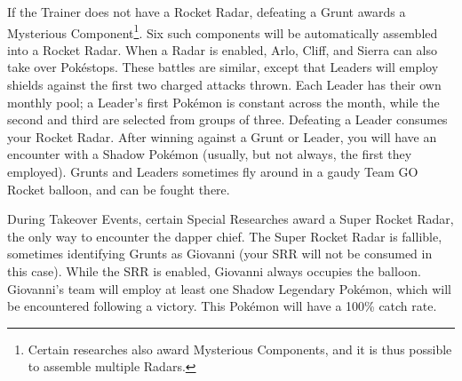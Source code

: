 If the Trainer does not have a Rocket Radar, defeating a Grunt awards a Mysterious Component\footnote{Certain researches also award Mysterious Components, and it is thus possible to assemble multiple Radars.}.
Six such components will be automatically assembled into a Rocket Radar.
When a Radar is enabled, Arlo, Cliff, and Sierra can also take over Pokéstops.
These battles are similar, except that Leaders will employ shields against the first two charged attacks thrown.
Each Leader has their own monthly pool; a Leader's first Pokémon is constant
 across the month, while the second and third are selected from groups of three.
Defeating a Leader consumes your Rocket Radar.
After winning against a Grunt or Leader, you will have an encounter with a Shadow Pokémon (usually,
 but not always, the first they employed).
Grunts and Leaders sometimes fly around in a gaudy Team GO Rocket balloon,
  and can be fought there.

During Takeover Events, certain Special Researches award a Super Rocket Radar,
 the only way to encounter the dapper chief.
The Super Rocket Radar is fallible, sometimes identifying Grunts as Giovanni
 (your SRR will not be consumed in this case).
While the SRR is enabled, Giovanni always occupies the balloon.
Giovanni's team will employ at least one Shadow Legendary Pokémon, which
 will be encountered following a victory.
This Pokémon will have a 100\% catch rate.
